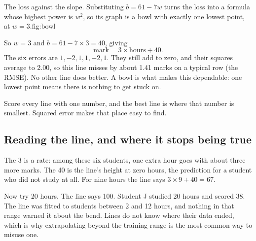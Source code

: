 \begin{utpfig}{The loss against the slope. Substituting $b=61-7w$ turns the loss into a formula whose highest power is $w^2$, so its graph is a bowl with exactly one lowest point, at $w=3$.}{fig:bowl}
\end{utpfig}

So $w=3$ and $b=61-7\times3=40$, giving
\[
  \text{mark}=3\times\text{hours}+40.
\]
The six errors are $1,-2,1,1,-2,1$. They still add to zero, and their squares average to 2.00, so this line misses by about 1.41 marks on a typical row (the RMSE). No other line does better. A bowl is what makes this dependable: one lowest point means there is nothing to get stuck on.

\begin{keyidea}
Score every line with one number, and the best line is where that number is smallest. Squared error makes that place easy to find.
\end{keyidea}

\subsection{Reading the line, and where it stops being true}

The 3 is a rate: among these six students, one extra hour goes with about three more marks. The 40 is the line's height at zero hours, the prediction for a student who did not study at all. For nine hours the line says $3\times9+40=67$.

Now try 20 hours. The line says 100. Student J studied 20 hours and scored 38. The line was fitted to students between 2 and 12 hours, and nothing in that range warned it about the bend. Lines do not know where their data ended, which is why extrapolating beyond the training range is the most common way to misuse one.


